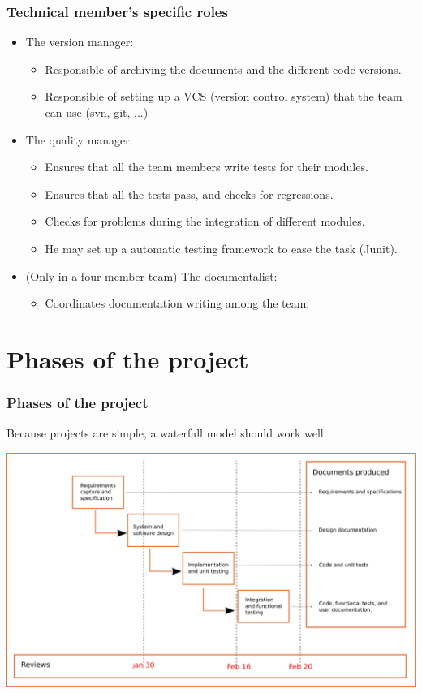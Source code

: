 \documentclass[10pt]{beamer}
\begin{document}
\begin{frame}
  \frametitle{Technical member's specific roles}
  \begin{itemize}
  \item The version manager:
    \begin{itemize}
    \item Responsible of archiving the documents and the different code versions.
    \item Responsible of setting up a VCS (version control system) that the team
      can use (svn, git, ...)
    \end{itemize}
  \item The quality manager:
    \begin{itemize}
    \item Ensures that all the team members write tests for their modules.
    \item Ensures that all the tests pass, and checks for regressions.
    \item Checks for problems during the integration of different modules.
    \item He may set up a automatic testing framework to ease the task (Junit).
    \end{itemize}

  \item (Only in a four member team) The documentalist:
    \begin{itemize}
    \item Coordinates documentation writing among the team.
    \end{itemize}
  \end{itemize}
\end{frame}

\section{Phases of the project}
\begin{frame}
  \frametitle{Phases of the project}
  Because projects are simple, a waterfall model should work well.

  \includegraphics[width=\linewidth]{phases}
\end{frame}
\end{document}
